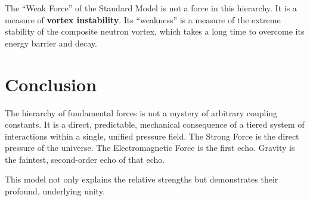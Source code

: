The ``Weak Force'' of the Standard Model is not a force in this hierarchy.  It is a measure of \textbf{vortex instability}.  Its ``weakness'' is a measure of the extreme stability of the composite neutron vortex, which takes a long time to overcome its energy barrier and decay.


\section{Conclusion}

The hierarchy of fundamental forces is not a mystery of arbitrary coupling constants.  It is a direct, predictable, mechanical consequence of a tiered system of interactions within a single, unified pressure field.  The Strong Force is the direct pressure of the universe.  The Electromagnetic Force is the first echo.  Gravity is the faintest, second-order echo of that echo.

This model not only explains the relative strengths but demonstrates their profound, underlying unity.
